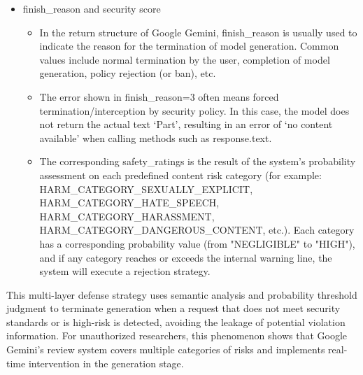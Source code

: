 \begin{itemize}
    \item finish\_reason and security score
    \begin{sloppypar}
    \begin{itemize}
        \item In the return structure of Google Gemini, finish\_reason is usually used to indicate the reason for the termination of model generation. Common values include normal termination by the user, completion of model generation, policy rejection (or ban), etc.
        \item The error shown in finish\_reason=3 often means forced termination/interception by security policy. In this case, the model does not return the actual text `Part', resulting in an error of `no content available' when calling methods such as response.text.
        \item The corresponding safety\_ratings is the result of the system's probability assessment on each predefined content risk category (for example: HARM\_CATEGORY\_SEXUALLY\_EXPLICIT, HARM\_CATEGORY\_HATE\_SPEECH, HARM\_CATEGORY\_HARASSMENT, HARM\_CATEGORY\_DANGEROUS\_CONTENT, etc.). Each category has a corresponding probability value (from "NEGLIGIBLE" to "HIGH"), and if any category reaches or exceeds the internal warning line, the system will execute a rejection strategy.
    \end{itemize}
    \end{sloppypar}
\end{itemize}

This multi-layer defense strategy uses semantic analysis and probability threshold judgment to terminate generation when a request that does not meet security standards or is high-risk is detected, avoiding the leakage of potential violation information. For unauthorized researchers, this phenomenon shows that Google Gemini's review system covers multiple categories of risks and implements real-time intervention in the generation stage.